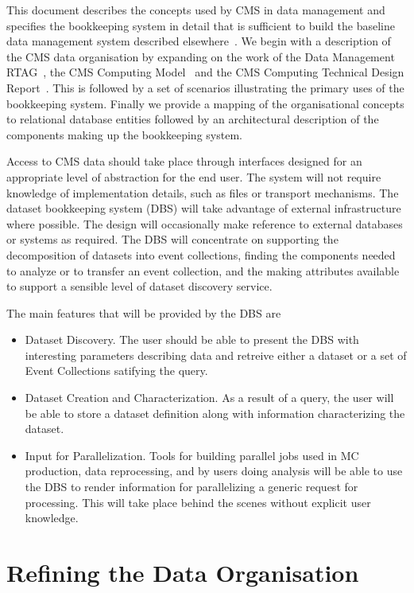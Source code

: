 \documentclass{cmspaper}
\begin{document}
This document describes the concepts used by CMS in data management and
specifies the bookkeeping system in detail that is sufficient to build the
baseline data management system described elsewhere~\cite{dmman}.  We begin
with a description of the CMS data organisation by expanding on the work of
the Data Management RTAG~\cite{rtag7}, the CMS Computing Model~\cite{CM} and
the CMS Computing Technical Design Report~\cite{CTDR}.
This is followed by a set of scenarios illustrating the primary uses of the
bookkeeping system.  Finally we provide a mapping of the organisational
concepts to relational database entities followed by an architectural
description of the components making up the bookkeeping system.

Access to CMS data should take place through interfaces designed for an 
appropriate level of abstraction for the end user.  The system will not require 
knowledge of implementation details, such as files or transport mechanisms. 
The dataset bookkeeping system (DBS) will take advantage of external infrastructure where 
possible.  The design will occasionally make 
reference to external databases or systems as required.  The DBS will 
concentrate on supporting the decomposition of datasets into event collections, 
finding the 
components needed to analyze or to transfer an event collection, and the making 
attributes available to support a sensible level of dataset discovery service.  

The main features that will be provided by the DBS are 
\begin{itemize}
\item Dataset Discovery.  The user should be able to present the DBS with 
interesting parameters describing data and retreive either a dataset or
a set of Event Collections satifying the query.
\item Dataset Creation and Characterization.  As a result of a query, the 
user will be able to store a dataset definition along with information 
characterizing the dataset.
\item Input for Parallelization.  Tools for building parallel jobs used in MC 
production, data reprocessing, and by users doing analysis will be able to use
the DBS to render information for parallelizing a generic request for processing.
This will take place behind the scenes without explicit user knowledge.
\end{itemize}

\section{Refining the Data Organisation}
\end{document}

